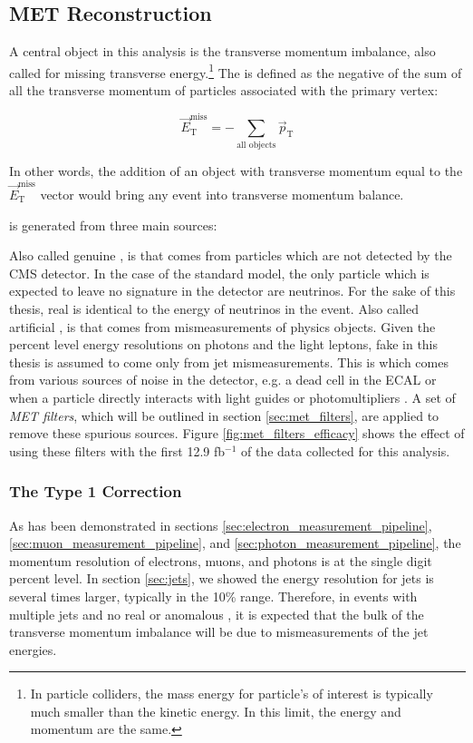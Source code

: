   \subsection{MET Reconstruction} \label{sec:MET_reco}
    A central object in this analysis is the transverse momentum imbalance, also called \MET for missing transverse energy.\footnote{In particle colliders, the mass energy for particle's of interest is typically much smaller than the kinetic energy. In this limit, the energy and momentum are the same.} The \MET is defined as the negative of the sum of all the transverse momentum of particles associated with the primary vertex:

    \[
      \vec{E}_{\text{T}}^{\text{miss}} = - \sum \limits_{\text{all objects}} \vec{p}_\text{T}
    \]

    In other words, the addition of an object with transverse momentum equal to the $\vec{E}_{\text{T}}^{\text{miss}}$ vector would bring any event into transverse momentum balance.

    \MET is generated from three main sources:
    \begin{enumerate}
       Also called genuine \MET, is \MET that comes from particles which are not detected by the CMS detector. In the case of the standard model, the only particle which is expected to leave no signature in the detector are neutrinos. For the sake of this thesis, real \MET is identical to the energy of neutrinos in the event.
       Also called artificial \MET, is \MET that comes from mismeasurements of physics objects. Given the percent level energy resolutions on photons and the light leptons, fake \MET in this thesis is assumed to come only from jet mismeasurements.
       This is \MET which comes from various sources of noise in the detector, e.g. a dead cell in the ECAL or when a particle directly interacts with light guides or photomultipliers \cite[sec 5]{cms_met}. A set of \emph{MET filters}, which will be outlined in section \ref{sec:met_filters}, are applied to remove these spurious sources. Figure \ref{fig:met_filters_efficacy} shows the effect of using these filters with the first 12.9 fb$^{-1}$ of the data collected for this analysis.
    \end{enumerate}

    \subsubsection{The Type 1 Correction} 
      As has been demonstrated in sections \ref{sec:electron_measurement_pipeline}, \ref{sec:muon_measurement_pipeline}, and \ref{sec:photon_measurement_pipeline}, the momentum resolution of electrons, muons, and photons is at the single digit percent level. In section \ref{sec:jets}, we showed the energy resolution for jets is several times larger, typically in the 10\% range. Therefore, in events with multiple jets and no real or anomalous \MET, it is expected that the bulk of the transverse momentum imbalance will be due to mismeasurements of the jet energies. 

